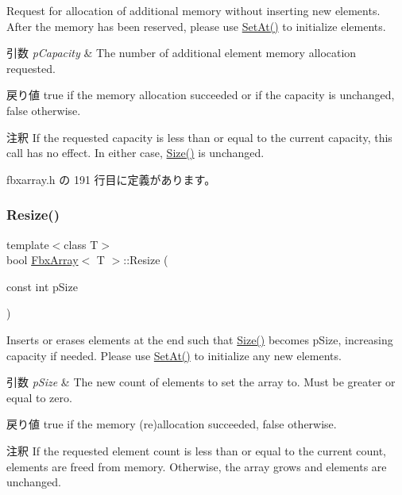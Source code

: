 Request for allocation of additional memory without inserting new elements. After the memory has been reserved, please use \hyperlink{class_fbx_array_a5229637f8e7dbee48fb8af9d03ecde14}{Set\+At()} to initialize elements. 
\begin{DoxyParams}{引数}
{\em p\+Capacity} & The number of additional element memory allocation requested. \\
\hline
\end{DoxyParams}
\begin{DoxyReturn}{戻り値}
{\ttfamily true} if the memory allocation succeeded or if the capacity is unchanged, {\ttfamily false} otherwise. 
\end{DoxyReturn}
\begin{DoxyRemark}{注釈}
If the requested capacity is less than or equal to the current capacity, this call has no effect. In either case, \hyperlink{class_fbx_array_aa76a0ceaf4b13a2acec7c0cdd1c08362}{Size()} is unchanged. 
\end{DoxyRemark}


 fbxarray.\+h の 191 行目に定義があります。

\mbox{\label{class_fbx_array_adc40ba9746e3d8586a525a3347c7cc4d}} 
\subsubsection{\texorpdfstring{Resize()}{Resize()}}
{\footnotesize\ttfamily template$<$class T$>$ \\
bool \hyperlink{class_fbx_array}{Fbx\+Array}$<$ T $>$\+::Resize (\begin{DoxyParamCaption}\item[{const int}]{p\+Size }\end{DoxyParamCaption})\hspace{0.3cm}{\ttfamily [inline]}}

Inserts or erases elements at the end such that \hyperlink{class_fbx_array_aa76a0ceaf4b13a2acec7c0cdd1c08362}{Size()} becomes p\+Size, increasing capacity if needed. Please use \hyperlink{class_fbx_array_a5229637f8e7dbee48fb8af9d03ecde14}{Set\+At()} to initialize any new elements. 
\begin{DoxyParams}{引数}
{\em p\+Size} & The new count of elements to set the array to. Must be greater or equal to zero. \\
\hline
\end{DoxyParams}
\begin{DoxyReturn}{戻り値}
{\ttfamily true} if the memory (re)allocation succeeded, {\ttfamily false} otherwise. 
\end{DoxyReturn}
\begin{DoxyRemark}{注釈}
If the requested element count is less than or equal to the current count, elements are freed from memory. Otherwise, the array grows and elements are unchanged. 
\end{DoxyRemark}


